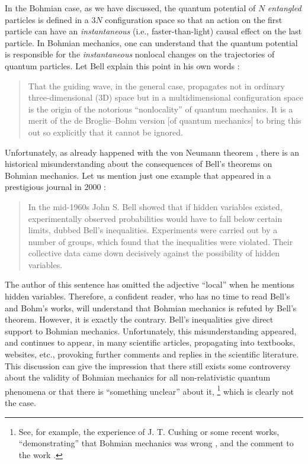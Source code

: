 \documentclass[nofootinbib, secnumarabic, amsmath, nobibnotes,11pt,aps,pra, floatfix]{revtex4-1}
\begin{document}
In the Bohmian case, as we have discussed, the quantum potential of $N$ \textit{entangled} particles is defined in a $3N$ configuration space so that an action on the first particle can have an \textit{instantaneous} (i.e., faster-than-light) causal effect on the last particle. In Bohmian mechanics, one can understand that the quantum potential is responsible for the \textit{instantaneous} nonlocal changes on the trajectories of quantum particles.
Let Bell explain this point in his own words \cite{om.Bell1987}:\vspace*{-6pt}\\
\begin{quote}
That the guiding wave, in the general case, propagates not in
ordinary three-dimensional (3D) space but in a multidimensional
configuration space is the origin of the notorious ``nonlocality''
of quantum mechanics. It is a merit of the de Broglie--Bohm version
[of quantum mechanics] to bring this out so explicitly that it
cannot be ignored.\vspace*{-6pt}\\
\end{quote}

Unfortunately, as already happened with the von Neumann theorem \cite{om.impossibility_proofs}, there is an historical misunderstanding about the consequences of Bell's theorems on Bohmian mechanics. Let us mention just one example that appeared in a prestigious journal in 2000 \cite{om.100years}:\vspace*{-6pt}\\
\begin{quote}
In the mid-1960s John S. Bell showed that if hidden variables existed, experimentally observed probabilities would have to fall below certain limits, dubbed Bell's inequalities. Experiments were carried out by a number of groups, which found that the inequalities were violated. Their collective data came down decisively against the possibility of hidden variables.\vspace*{-6pt}\\
\end{quote}
The author of this sentence has omitted the adjective ``local'' when
he mentions hidden variables. Therefore, a confident reader, who has
no time to read Bell's and Bohm's works, will understand that
Bohmian mechanics is refuted by Bell's theorem. However, it is
exactly the contrary. Bell's inequalities give direct support to
Bohmian mechanics. Unfortunately, this misunderstanding appeared,
and continues to appear, in many scientific articles, propagating
into textbooks, websites, etc., provoking further comments and
replies in the scientific literature. This discussion can give the
impression that there still exists some controversy about the
validity of Bohmian mechanics for all non-relativistic quantum phenomena or that there is ``something unclear''
about  it,%
\footnote{See, for example, the experience
of J. T. Cushing \cite{om.erors2} or some recent works,
``demonstrating'' that Bohmian mechanics was wrong
\cite{om.bifoton2}, and the comment to the work
\cite{om.bifoton1}.} which is clearly not the case.\enlargethispage{-1pc}
\end{document}
